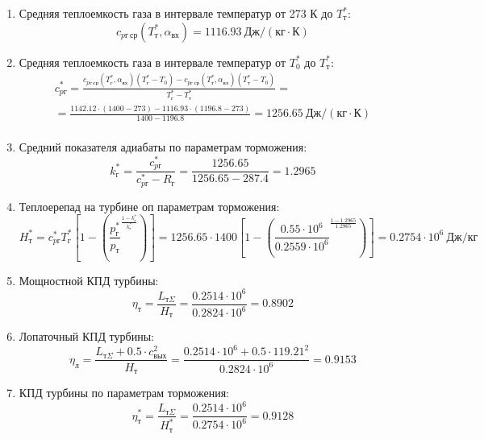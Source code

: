 \documentclass[a4paper,10pt]{article}
\begin{document}
\begin{enumerate}
        \item Средняя теплоемкость газа в интервале температур от 273 К до $T_т^*$:
        \[
            c_{pг\ ср} (T_т^*, \alpha_{вх}) =
            1116.93 \ Дж/(кг \cdot К)
        \]

        \item Средняя теплоемкость газа в интервале температур от $T_0^*$ до $T_т^*$:
        \begin{gather*}
            c_{pг}^* = \frac{
		         c_{pг\ ср} (T_г^*, \alpha_{вх}) (T_г^* - T_0) - c_{pг\ ср} (T_т^*, \alpha_{вх})(T_т^* - T_0)
		    }{
		        T_г^* - T_т^*} =\\
            =\frac{
                1142.12 \cdot
                (1400 - 273) -
		        1116.93 \cdot
                (1196.8 - 273)
		    }{
		        1400 - 1196.8} =
		    1256.65 \ Дж / (кг \cdot К)\\
        \end{gather*}

        \item Средний показателя адиабаты по параметрам торможения:
        \[
            k_г^* = \frac{ c_{pг}^* }{ c_{pг}^* - R_г } =
                \frac{
                    1256.65
                }{
                    1256.65 - 287.4
                }
            = 1.2965
        \]

        \item Теплоерепад на турбине оп параметрам торможения:
        \[
             H_т^* = c_{pг}^* T_г^* \left[
                        1 - \left(
                                \frac{p_г^*}{p_т} ^
                                \frac{1 - k_г^*}{k_г^*}
                    \right)
                \right] =
            1256.65 \cdot 1400
                \left[
                    1 - \left(
                            \frac{
                                0.55 \cdot 10^6
                            }{
                                0.2559 \cdot 10^6 } ^
                            \frac{ 1 - 1.2965 }{ 1.2965 }
                    \right)
            \right] =
            0.2754 \cdot 10^6 \ Дж/кг
        \]

        \item Мощностной КПД турбины:
        \[
            \eta_т = \frac{ L_{т\Sigma} }{ H_т } =
                \frac{ 0.2514 \cdot 10^6 }{ 0.2824 \cdot 10^6 } =
            0.8902
        \]

        \item Лопаточный КПД турбины:
        \[
            \eta_л = \frac{
                        L_{т\Sigma} + 0.5 \cdot c_{вых}^2
                    }{ H_т } =
            \frac{
                0.2514 \cdot 10^6 + 0.5 \cdot 119.21 ^ 2
            }{ 0.2824 \cdot 10^6 } =
            0.9153
        \]

        \item КПД турбины по параметрам торможения:
        \[
            \eta_т^* = \frac{ L_{т\Sigma} }{ H_т^* } =
                \frac{ 0.2514 \cdot 10^6 }{ 0.2754 \cdot 10^6 } =
            0.9128
        \]

    \end{enumerate}
    
\end{document}
